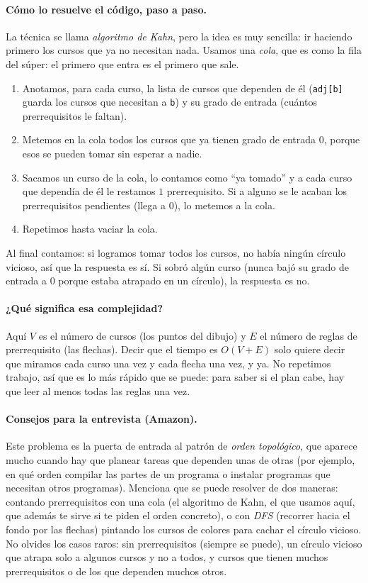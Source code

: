 \paragraph{Cómo lo resuelve el código, paso a paso.} La técnica se llama
\emph{algoritmo de Kahn}, pero la idea es muy sencilla: ir haciendo primero los
cursos que ya no necesitan nada. Usamos una \emph{cola}, que es como la fila
del súper: el primero que entra es el primero que sale.
\begin{enumerate}
  \item Anotamos, para cada curso, la lista de cursos que dependen de él
        (\texttt{adj[b]} guarda los cursos que necesitan a \texttt{b}) y su
        grado de entrada (cuántos prerrequisitos le faltan).
  \item Metemos en la cola todos los cursos que ya tienen grado de entrada $0$,
        porque esos se pueden tomar sin esperar a nadie.
  \item Sacamos un curso de la cola, lo contamos como ``ya tomado'' y a cada
        curso que dependía de él le restamos $1$ prerrequisito. Si a alguno se
        le acaban los prerrequisitos pendientes (llega a $0$), lo metemos a la
        cola.
  \item Repetimos hasta vaciar la cola.
\end{enumerate}
Al final contamos: si logramos tomar todos los cursos, no había ningún círculo
vicioso, así que la respuesta es sí. Si sobró algún curso (nunca bajó su grado
de entrada a $0$ porque estaba atrapado en un círculo), la respuesta es no.




\paragraph{¿Qué significa esa complejidad?} Aquí $V$ es el número de cursos (los
puntos del dibujo) y $E$ el número de reglas de prerrequisito (las flechas).
Decir que el tiempo es $O(V+E)$ solo quiere decir que miramos cada curso una
vez y cada flecha una vez, y ya. No repetimos trabajo, así que es lo más rápido
que se puede: para saber si el plan cabe, hay que leer al menos todas las reglas
una vez.

\paragraph{Consejos para la entrevista (Amazon).} Este problema es la puerta de
entrada al patrón de \emph{orden topológico}, que aparece mucho cuando hay que
planear tareas que dependen unas de otras (por ejemplo, en qué orden compilar
las partes de un programa o instalar programas que necesitan otros programas).
Menciona que se puede resolver de dos maneras: contando prerrequisitos con una
cola (el algoritmo de Kahn, el que usamos aquí, que además te sirve si te piden
el orden concreto), o con \emph{DFS} (recorrer hacia el fondo por las flechas)
pintando los cursos de colores para cachar el círculo vicioso. No olvides los
casos raros: sin prerrequisitos (siempre se puede), un círculo vicioso que
atrapa solo a algunos cursos y no a todos, y cursos que tienen muchos
prerrequisitos o de los que dependen muchos otros.
